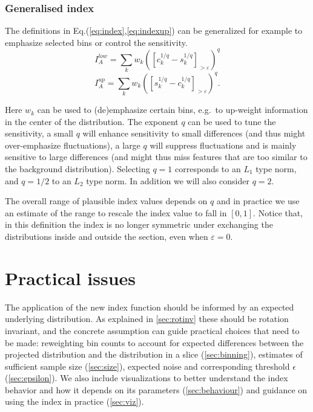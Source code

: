 \documentclass[]{interact}
\theoremstyle{plain}%
\theoremstyle{definition}
\theoremstyle{remark}
\begin{document}
\hypertarget{sec:generalise}{%
\subsubsection*{Generalised index}\label{sec:generalise}}

The definitions in Eq.(\ref{eq:index},\ref{eq:indexup}) can be
generalized for example to emphasize selected bins or control the
sensitivity. \begin{equation}
I_A^{low} = \sum_{k}w_{k}\left(\left[c_{k}^{1/q}-s_{k}^{1/q}\right]_{>\varepsilon}\right)^{q}
\label{eq:index2}
\end{equation} \begin{equation}
I_A^{up} = \sum_{k}w_{k}\left(\left[s_{k}^{1/q}-c_{k}^{1/q}\right]_{>\varepsilon}\right)^{q}.
\label{eq:index2up}
\end{equation}

Here \(w_k\) can be used to (de)emphasize certain bins, e.g.~to
up-weight information in the center of the distribution. The exponent
\(q\) can be used to tune the sensitivity, a small \(q\) will enhance
sensitivity to small differences (and thus might over-emphasize
fluctuations), a large \(q\) will suppress fluctuations and is mainly
sensitive to large differences (and might thus miss features that are
too similar to the background distribution). Selecting \(q=1\)
corresponds to an \(L_1\) type norm, and \(q=1/2\) to an \(L_2\) type
norm. In addition we will also consider \(q=2\).

The overall range of plausible index values depends on \(q\) and in
practice we use an estimate of the range to rescale the index value to
fall in \([0,1]\). Notice that, in this definition the index is no
longer symmetric under exchanging the distributions inside and outside
the section, even when \(\varepsilon=0\).

\hypertarget{practical-issues}{%
\section{\texorpdfstring{Practical issues
\label{sec:practical}}{Practical issues }}\label{practical-issues}}

The application of the new index function should be informed by an
expected underlying distribution. As explained in \ref{sec:rotinv} these
should be rotation invariant, and the concrete assumption can guide
practical choices that need to be made: reweighting bin counts to
account for expected differences between the projected distribution and
the distribution in a slice (\ref{sec:binning}), estimates of sufficient
sample size (\ref{sec:size}), expected noise and corresponding threshold
\(\epsilon\) (\ref{sec:epsilon}). We also include visualizations to
better understand the index behavior and how it depends on its
parameters (\ref{sec:behaviour}) and guidance on using the index in
practice (\ref{sec:viz}).
\end{document}
